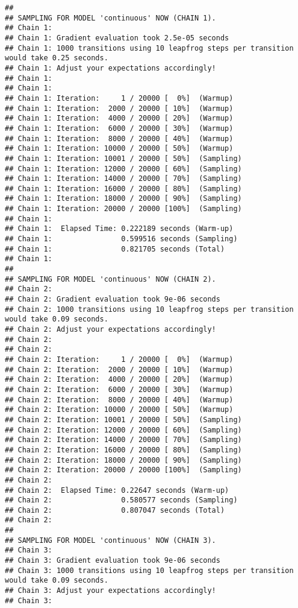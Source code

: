 \documentclass[
]{article}
\begin{document}
\begin{verbatim}
## 
## SAMPLING FOR MODEL 'continuous' NOW (CHAIN 1).
## Chain 1: 
## Chain 1: Gradient evaluation took 2.5e-05 seconds
## Chain 1: 1000 transitions using 10 leapfrog steps per transition would take 0.25 seconds.
## Chain 1: Adjust your expectations accordingly!
## Chain 1: 
## Chain 1: 
## Chain 1: Iteration:     1 / 20000 [  0%]  (Warmup)
## Chain 1: Iteration:  2000 / 20000 [ 10%]  (Warmup)
## Chain 1: Iteration:  4000 / 20000 [ 20%]  (Warmup)
## Chain 1: Iteration:  6000 / 20000 [ 30%]  (Warmup)
## Chain 1: Iteration:  8000 / 20000 [ 40%]  (Warmup)
## Chain 1: Iteration: 10000 / 20000 [ 50%]  (Warmup)
## Chain 1: Iteration: 10001 / 20000 [ 50%]  (Sampling)
## Chain 1: Iteration: 12000 / 20000 [ 60%]  (Sampling)
## Chain 1: Iteration: 14000 / 20000 [ 70%]  (Sampling)
## Chain 1: Iteration: 16000 / 20000 [ 80%]  (Sampling)
## Chain 1: Iteration: 18000 / 20000 [ 90%]  (Sampling)
## Chain 1: Iteration: 20000 / 20000 [100%]  (Sampling)
## Chain 1: 
## Chain 1:  Elapsed Time: 0.222189 seconds (Warm-up)
## Chain 1:                0.599516 seconds (Sampling)
## Chain 1:                0.821705 seconds (Total)
## Chain 1: 
## 
## SAMPLING FOR MODEL 'continuous' NOW (CHAIN 2).
## Chain 2: 
## Chain 2: Gradient evaluation took 9e-06 seconds
## Chain 2: 1000 transitions using 10 leapfrog steps per transition would take 0.09 seconds.
## Chain 2: Adjust your expectations accordingly!
## Chain 2: 
## Chain 2: 
## Chain 2: Iteration:     1 / 20000 [  0%]  (Warmup)
## Chain 2: Iteration:  2000 / 20000 [ 10%]  (Warmup)
## Chain 2: Iteration:  4000 / 20000 [ 20%]  (Warmup)
## Chain 2: Iteration:  6000 / 20000 [ 30%]  (Warmup)
## Chain 2: Iteration:  8000 / 20000 [ 40%]  (Warmup)
## Chain 2: Iteration: 10000 / 20000 [ 50%]  (Warmup)
## Chain 2: Iteration: 10001 / 20000 [ 50%]  (Sampling)
## Chain 2: Iteration: 12000 / 20000 [ 60%]  (Sampling)
## Chain 2: Iteration: 14000 / 20000 [ 70%]  (Sampling)
## Chain 2: Iteration: 16000 / 20000 [ 80%]  (Sampling)
## Chain 2: Iteration: 18000 / 20000 [ 90%]  (Sampling)
## Chain 2: Iteration: 20000 / 20000 [100%]  (Sampling)
## Chain 2: 
## Chain 2:  Elapsed Time: 0.22647 seconds (Warm-up)
## Chain 2:                0.580577 seconds (Sampling)
## Chain 2:                0.807047 seconds (Total)
## Chain 2: 
## 
## SAMPLING FOR MODEL 'continuous' NOW (CHAIN 3).
## Chain 3: 
## Chain 3: Gradient evaluation took 9e-06 seconds
## Chain 3: 1000 transitions using 10 leapfrog steps per transition would take 0.09 seconds.
## Chain 3: Adjust your expectations accordingly!
## Chain 3: 

\end{verbatim}
\end{document}
